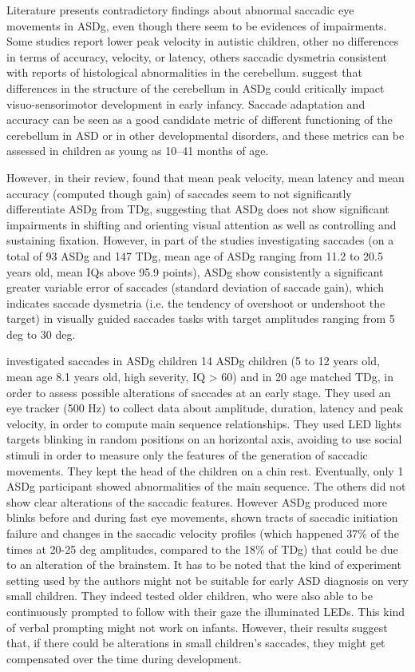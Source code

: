 Literature presents contradictory findings about abnormal saccadic eye movements in ASDg, even though there seem to be evidences of impairments. Some studies report lower peak velocity in autistic children, other no differences in terms of accuracy, velocity, or latency, others saccadic dysmetria consistent with reports of histological abnormalities in the cerebellum. \cite{freedman2017biomarkers} suggest that differences in the structure of the cerebellum in ASDg could critically impact visuo-sensorimotor development in early infancy. Saccade adaptation and accuracy can be seen as a good candidate metric of different functioning of the cerebellum in ASD or in other developmental disorders, and these metrics can be assessed in children as young as 10–41 months of age.

However, in their review, \cite{johnson2016review} found that mean peak velocity, mean latency and mean accuracy (computed though gain) of saccades seem to not significantly differentiate ASDg from TDg, suggesting that ASDg does not show significant impairments in shifting and orienting visual attention as well as controlling and sustaining fixation. However, in part of the studies investigating saccades (on a total of 93 ASDg and 147 TDg, mean age of ASDg ranging from 11.2 to 20.5 years old, mean IQs above 95.9 points), ASDg show consistently a significant greater variable error of saccades (standard deviation of saccade gain), which indicates saccade dysmetria (i.e. the tendency of overshoot or undershoot the target) in visually guided saccades tasks with target amplitudes ranging from 5 deg to 30 deg.

\cite{pensiero2009saccades} investigated saccades in ASDg children 14 ASDg children (5 to 12 years old, mean age 8.1 years old, high severity, IQ > 60) and in 20 age matched TDg, in order to assess possible alterations of saccades at an early stage. They used an eye tracker (500 Hz) to collect data about amplitude, duration, latency and peak velocity, in order to compute main sequence relationships. They used LED lights targets blinking in random positions on an horizontal axis, avoiding to use social stimuli in order to measure only the features of the generation of saccadic movements. They kept the head of the children on a chin rest.
Eventually, only 1 ASDg participant showed abnormalities of the main sequence. The others did not show clear alterations of the saccadic features. However ASDg produced more blinks before and during fast eye movements, shown tracts of saccadic initiation failure and changes in the saccadic velocity profiles (which happened 37\% of the times at 20-25 deg amplitudes, compared to the 18\% of TDg) that could be due to an alteration of the brainstem.
It has to be noted that the kind of experiment setting used by the authors might not be suitable for early ASD diagnosis on very small children. They indeed tested older children, who were also able to be continuously prompted to follow with their gaze the illuminated LEDs. This kind of verbal prompting might not work on infants. However, their results suggest that, if there could be alterations in small children’s saccades, they might get compensated over the time during development.

